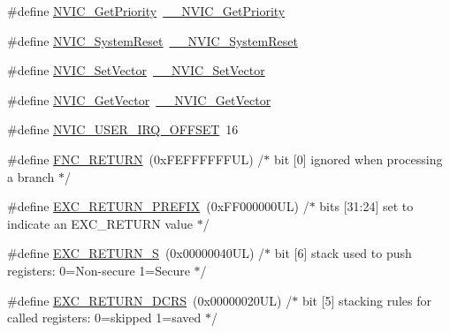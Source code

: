 \begin{DoxyCompactItemize}
\item 
\#define \hyperlink{group___c_m_s_i_s___core___n_v_i_c_functions_gaf59b9d0a791d2157abb319753953eceb}{N\+V\+I\+C\+\_\+\+Get\+Priority}~\hyperlink{group___c_m_s_i_s___core___n_v_i_c_functions_gaeb9dc99c8e7700668813144261b0bc73}{\+\_\+\+\_\+\+N\+V\+I\+C\+\_\+\+Get\+Priority}
\item 
\#define \hyperlink{group___c_m_s_i_s___core___n_v_i_c_functions_ga6aa0367d3642575610476bf0366f0c48}{N\+V\+I\+C\+\_\+\+System\+Reset}~\hyperlink{group___c_m_s_i_s___core___n_v_i_c_functions_ga0d9aa2d30fa54b41eb780c16e35b676c}{\+\_\+\+\_\+\+N\+V\+I\+C\+\_\+\+System\+Reset}
\item 
\#define \hyperlink{group___c_m_s_i_s___core___n_v_i_c_functions_ga804af63bb4c4c317387897431814775d}{N\+V\+I\+C\+\_\+\+Set\+Vector}~\hyperlink{group___c_m_s_i_s___core___n_v_i_c_functions_ga0df355460bc1783d58f9d72ee4884208}{\+\_\+\+\_\+\+N\+V\+I\+C\+\_\+\+Set\+Vector}
\item 
\#define \hyperlink{group___c_m_s_i_s___core___n_v_i_c_functions_ga955eb1c33a3dcc62af11a8385e8c0fc8}{N\+V\+I\+C\+\_\+\+Get\+Vector}~\hyperlink{group___c_m_s_i_s___core___n_v_i_c_functions_ga44b665d2afb708121d9b10c76ff00ee5}{\+\_\+\+\_\+\+N\+V\+I\+C\+\_\+\+Get\+Vector}
\item 
\#define \hyperlink{group___c_m_s_i_s___core___n_v_i_c_functions_ga8045d905a5ca57437d8e6f71ffcb6df5}{N\+V\+I\+C\+\_\+\+U\+S\+E\+R\+\_\+\+I\+R\+Q\+\_\+\+O\+F\+F\+S\+ET}~16
\item 
\#define \hyperlink{group___c_m_s_i_s___core___n_v_i_c_functions_gabaa62910bf89acc186ae998c611e64ab}{F\+N\+C\+\_\+\+R\+E\+T\+U\+RN}~(0x\+F\+E\+F\+F\+F\+F\+F\+F\+U\+L)     /$\ast$ bit \mbox{[}0\mbox{]} ignored when processing a branch                             $\ast$/
\item 
\#define \hyperlink{group___c_m_s_i_s___core___n_v_i_c_functions_ga99e0c1c19f050880a8bd827a7f420bec}{E\+X\+C\+\_\+\+R\+E\+T\+U\+R\+N\+\_\+\+P\+R\+E\+F\+IX}~(0x\+F\+F000000\+U\+L)     /$\ast$ bits \mbox{[}31\+:24\mbox{]} set to indicate an E\+X\+C\+\_\+\+R\+E\+T\+U\+R\+N value                     $\ast$/
\item 
\#define \hyperlink{group___c_m_s_i_s___core___n_v_i_c_functions_ga88711355d0196b1ffeb18c33e2c95360}{E\+X\+C\+\_\+\+R\+E\+T\+U\+R\+N\+\_\+S}~(0x00000040\+U\+L)     /$\ast$ bit \mbox{[}6\mbox{]} stack used to push registers\+: 0=\+Non-\/secure 1=\+Secure          $\ast$/
\item 
\#define \hyperlink{group___c_m_s_i_s___core___n_v_i_c_functions_ga0a0f2c03b4aef2c02bdae044bda1324b}{E\+X\+C\+\_\+\+R\+E\+T\+U\+R\+N\+\_\+\+D\+C\+RS}~(0x00000020\+U\+L)     /$\ast$ bit \mbox{[}5\mbox{]} stacking rules for called registers\+: 0=skipped 1=saved       $\ast$/

\end{DoxyCompactItemize}
